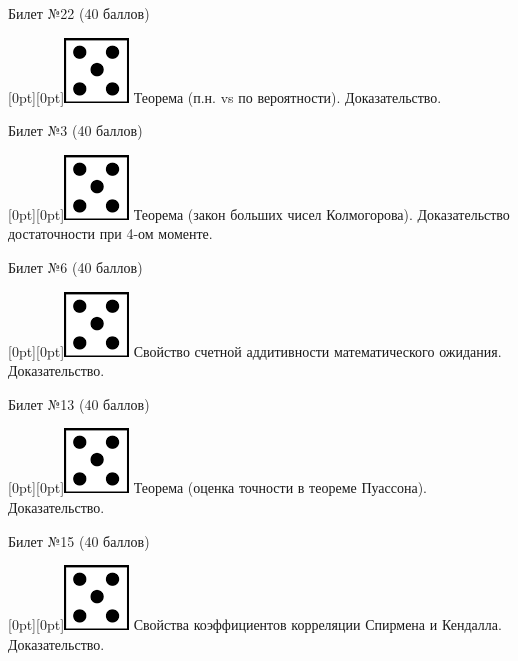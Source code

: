 \documentclass[10pt]{article}
\begin{document}
\begin{center} {\Large Билет №22 (40 баллов)} \end{center}

\raisebox{-1pt}[0pt][0pt]{\includegraphics[width=0.02\linewidth]{5.png}} Теорема (п.н. vs по вероятности). Доказательство. \\

\begin{center} {\Large Билет №3 (40 баллов)} \end{center}

\raisebox{-1pt}[0pt][0pt]{\includegraphics[width=0.02\linewidth]{5.png}} Теорема (закон больших чисел Колмогорова). Доказательство достаточности при 4-ом моменте. \\

\begin{center} {\Large Билет №6 (40 баллов)} \end{center}

\raisebox{-1pt}[0pt][0pt]{\includegraphics[width=0.02\linewidth]{5.png}}  Свойство счетной аддитивности математического ожидания. Доказательство. \\

\begin{center} {\Large Билет №13 (40 баллов)} \end{center}

\raisebox{-1pt}[0pt][0pt]{\includegraphics[width=0.02\linewidth]{5.png}} Теорема (оценка точности в теореме Пуассона). Доказательство. \\

\begin{center} {\Large Билет №15 (40 баллов)} \end{center}

\raisebox{-1pt}[0pt][0pt]{\includegraphics[width=0.02\linewidth]{5.png}} Свойства коэффициентов корреляции Спирмена и Кендалла. Доказательство. \\ 
\end{document}
